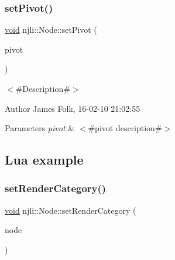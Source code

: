 \begin{DoxyCodeInclude}
\end{DoxyCodeInclude}
\mbox{\label{classnjli_1_1_node_a84a2fde3b93ec048a3ccfa7a993307cf}} 
\subsubsection{\texorpdfstring{set\+Pivot()}{setPivot()}}
{\footnotesize\ttfamily \mbox{\hyperlink{_thread_8h_af1e856da2e658414cb2456cb6f7ebc66}{void}} njli\+::\+Node\+::set\+Pivot (\begin{DoxyParamCaption}\item[{const bt\+Transform \&}]{pivot }\end{DoxyParamCaption})}



$<$\#\+Description\#$>$ 

\begin{DoxyAuthor}{Author}
James Folk, 16-\/02-\/10 21\+:02\+:55
\end{DoxyAuthor}

\begin{DoxyParams}{Parameters}
{\em pivot} & $<$\#pivot description\#$>$\\
\hline
\end{DoxyParams}
\hypertarget{classnjli_1_1_steering_behavior_wander_ex1}{}\subsection{Lua example}\label{classnjli_1_1_steering_behavior_wander_ex1}

\begin{DoxyCodeInclude}
\end{DoxyCodeInclude}
\mbox{\label{classnjli_1_1_node_a62df3bc99a3cb060be7532b6c265eb4b}} 
\subsubsection{\texorpdfstring{set\+Render\+Category()}{setRenderCategory()}}
{\footnotesize\ttfamily \mbox{\hyperlink{_thread_8h_af1e856da2e658414cb2456cb6f7ebc66}{void}} njli\+::\+Node\+::set\+Render\+Category (\begin{DoxyParamCaption}\item[{\mbox{\hyperlink{classnjli_1_1_node}{Node}} $\ast$}]{node }\end{DoxyParamCaption})}



